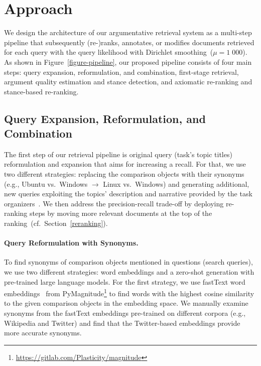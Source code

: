 \section{Approach}\label{approach}



We design the architecture of our argumentative retrieval system as a multi-step pipeline that subsequently (re-)ranks, annotates, or modifies documents retrieved for each query with the query likelihood with Dirichlet smoothing~(\(\mu = 1\;000\)). As shown in Figure~\ref{figure-pipeline}, our proposed pipeline consists of four main steps:
\Ni query expansion, reformulation, and combination,
\Nii first-stage retrieval,
\Niii argument quality estimation and stance detection,
and \Niv axiomatic re-ranking and stance-based re-ranking.

\subsection{Query Expansion, Reformulation, and Combination}
\label{reformulation}

The first step of our retrieval pipeline is original query (task's topic titles) reformulation and expansion that aims for increasing a recall.
For that, we use two different strategies: \Ni replacing the comparison objects with their synonyms (e.g., Ubuntu vs.\ Windows $\rightarrow$ Linux vs.\ Windows) and \Nii generating additional, new queries exploiting the topics' description and narrative provided by the task organizers~\cite{BondarenkoFKSGBPBSWPH2022}.
We then address the precision-recall trade-off by deploying re-ranking steps by moving more relevant documents at the top of the ranking~(cf.\ Section~\ref{reranking}).

\paragraph{Query Reformulation with Synonyms.}

To find synonyms of comparison objects mentioned in questions (search queries), we use two different strategies: \Ni word embeddings and \Nii a zero-shot generation with pre-trained large language models.
For the first strategy, we use fastText word embeddings~\cite{BojanowskiGJM2017} from PyMagnitude\footnote{\url{https://gitlab.com/Plasticity/magnitude}} to find words with the highest cosine similarity to the given comparison objects in the embedding space.
We manually examine synonyms from the fastText embeddings pre-trained on different corpora (e.g., Wikipedia and Twitter) and find that the Twitter-based embeddings provide more accurate synonyms.

